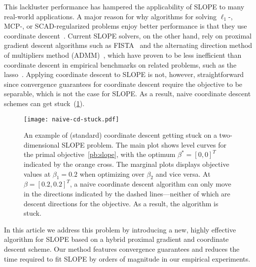 This lackluster performance has hampered the applicability of SLOPE to many
real-world applications. A major reason for why algorithms for solving
$\ell_1$-, MCP-, or SCAD-regularized problems enjoy better performance is that
they use coordinate
descent~\parencite{tseng2001convergence,friedman2010,breheny2011}. Current SLOPE
solvers, on the other hand, rely on proximal gradient descent algorithms such
as FISTA~\parencite{beck2009} and the alternating direction method of multipliers
method (ADMM)~\parencite{boyd2010}, which have proven to be less inefficient than
coordinate descent in empirical benchmarks on related problems, such as the
lasso~\parencite{moreau2022benchopt}. Applying coordinate descent to SLOPE is not,
however, straightforward since convergence guarantees for coordinate descent
require the objective to be separable, which is not the case for SLOPE. As a
result, naive coordinate descent schemes can get
stuck~(\cref{fig:naive-cd-stuck}).

\begin{figure}[htb]
  \centering
  \texttt{[image: naive-cd-stuck.pdf]}
  \caption{%
    An example of (standard) coordinate descent getting stuck on a two-dimensional SLOPE problem.
    The main plot shows level curves for the primal objective~\eqref{pb:slope}, with the optimum \(\beta^* = [0, 0]^T\) indicated by the orange cross.
    The marginal plots displays objective values at \(\beta_1 = 0.2\) when optimizing over \(\beta_2\) and vice versa.
    At \(\beta = [0.2,0.2]^T\), a naive coordinate descent algorithm can only move in the directions indicated by the dashed lines---neither of which are descent directions for the objective.
    As a result, the algorithm is stuck.
  }
  \label{fig:naive-cd-stuck}
\end{figure}


In this article we address this problem by introducing a new, highly effective
algorithm for SLOPE based on a hybrid proximal gradient and coordinate descent
scheme. Our method features convergence guarantees and reduces the time
required to fit SLOPE by orders of magnitude in our empirical experiments.
